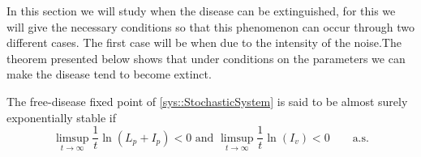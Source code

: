 	In this section we will study when the disease can be extinguished, for 
this we will give the necessary conditions so that this phenomenon can occur 
through two different cases. The first case will be when due to the intensity 
of the noise.The theorem presented below shows that under conditions on the
parameters we can make the disease tend to become extinct.
\begin{definition}\label{def::ExponentialStability}
The free-disease fixed point of \autoref{sys::StochasticSystem} is said to be almost surely exponentially stable if
\begin{equation}\label{eqn::ExponentialStability}
		\limsup_{t \to \infty}
		\frac{1}{t}
		\ln(L_p + I_p) < 0 \text{ and }
		\limsup_{t \to \infty}
		\frac{1}{t}\ln(I_v)< 0\qquad\mbox{a.s.}
\end{equation}
\end{definition}

